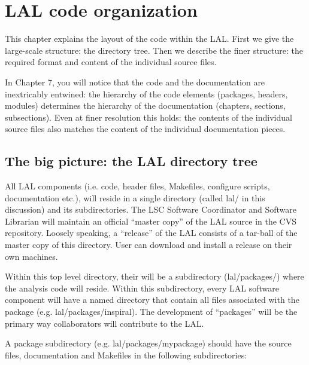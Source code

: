 \documentclass[]{ligodcc}
\begin{document}
\section{LAL code organization}
\label{sec:lalcode}

This chapter explains the layout of the code within the LAL. First we
give the large-scale structure: the directory tree.  Then we
describe the finer structure: the required format and content of the
individual source files.  

In Chapter 7, you will notice that the code and the  documentation are
inextricably entwined: the hierarchy  of the code elements (packages,
headers, modules)  determines the hierarchy of the documentation
(chapters, sections, subsections).  Even at finer resolution this
holds:  the contents of the individual source files also matches the
content of the individual documentation pieces.

\subsection{The big picture: the LAL directory tree}
All LAL components (i.e. code, header files, Makefiles, configure
scripts, documentation etc.), will reside in a single directory
(called lal/ in this discussion) and its subdirectories.  The LSC
Software Coordinator and Software Librarian will maintain an official
``master copy'' of the LAL source in the CVS repository. Loosely
speaking, a ``release'' of the LAL consists of a tar-ball of the
master copy of this directory. User can download and install a release
on their own machines. 

Within this top level directory, their will be a subdirectory
(lal/packages/) where the analysis code will reside. Within this
subdirectory, every LAL software component will have a named directory
that contain all files associated with the package (e.g.
lal/packages/inspiral). The development of ``packages'' will be the
primary way  collaborators will contribute to the LAL. 

A package subdirectory  (e.g. lal/packages/mypackage) should have the
source files, documentation  and Makefiles in the following
subdirectories:
\end{document}
